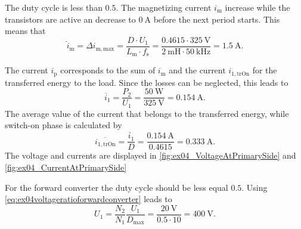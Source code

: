 \begin{solutionblock}
    The duty cycle is less than $0.5$. The magnetizing current $i_\mathrm{m}$ increase while the transistors are active an decrease 
    to $\SI{0}{\ampere}$ before the next period starts.
    This means that
    \begin{equation}
        \hat{i}_\mathrm{m}=\Delta i_\mathrm{m,max}= \frac{D \cdot U_\mathrm{1}}{L_\mathrm{m} \cdot f_\mathrm{s}} =
        \frac{0.4615 \cdot \SI{325}{\volt}}{\SI{2}{\milli\henry} \cdot \SI{50}{\kilo\hertz}} = \SI{1.5}{\ampere}.
    \end{equation}    
\end{solutionblock}


\begin{solutionblock}
    The current $i_\mathrm{p}$ corresponds to the sum of $i_\mathrm{m}$ and the current $i_\mathrm{1,trOn}$ for the transferred energy to the load.
    Since the losses can be neglected, this leads to
    \begin{equation}
        \overline{i}_\mathrm{1}=\frac{P_\mathrm{2}}{U_\mathrm{1}}=\frac{\SI{50}{\watt}}{\SI{325}{\volt}}=\SI{0.154}{\ampere}.
    \end{equation}    
    The average value of the current that belongs to the transferred energy, while switch-on phase is calculated by
    \begin{equation}
        \overline{i_\mathrm{1,trOn}}=\frac{\overline{i}_\mathrm{1}}{D}=\frac{\SI{0.154}{\ampere}}{0.4615}=\SI{0.333}{\ampere}.
    \end{equation}
    The voltage and currents are displayed in \autoref{fig:ex04_VoltageAtPrimarySide} and \autoref{fig:ex04_CurrentAtPrimarySide}
    
\end{solutionblock}
\FloatBarrier
{}
\begin{solutionblock}
    For the forward converter the duty cycle should be less equal $0.5$. Using \eqref{eq:ex04voltageratioforwardconverter} leads to
    \begin{equation}
        U_\mathrm{1}=\frac{N_\mathrm{2}}{N_\mathrm{1}}\frac{U_\mathrm{1}}{D_\mathrm{max}}=
        \frac{\SI{20}{\volt}}{0.5 \cdot 10}=\SI{400}{\volt}.
    \end{equation}
\end{solutionblock}


